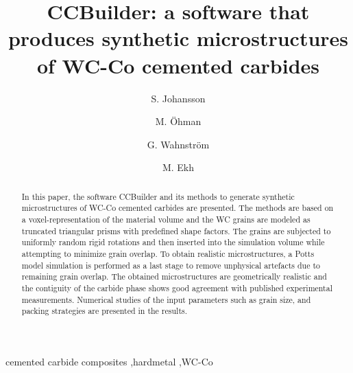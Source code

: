 \documentclass[3p,12pt]{elsarticle}
\begin{document}
\begin{frontmatter}

\title{CCBuilder: a software that produces synthetic microstructures of WC-Co cemented carbides}

\author[tf]{S. Johansson}

\author[tm]{M. Öhman}

\author[tf]{G. Wahnstr\"om}

\author[tm]{M. Ekh}

\address[tm]{Chalmers University of Technology, Department of Applied Mechanics, SE41258 G\"oteborg, Sweden}
\address[tf]{Chalmers University of Technology, Department of Applied Physics, SE41296 G\"oteborg, Sweden}

\begin{abstract}
In this paper, the software CCBuilder and its methods to generate synthetic microstructures of WC-Co cemented carbides are presented.
The methods are based on a voxel-representation of the material volume and the WC grains are modeled as truncated triangular prisms with predefined shape factors.
The grains are subjected to uniformly random rigid rotations and then inserted into the simulation volume while attempting to minimize grain overlap.
To obtain realistic microstructures, a Potts model simulation is performed as a last stage to remove unphysical artefacts due to remaining grain overlap.
The obtained microstructures are geometrically realistic and the contiguity of the carbide phase shows good agreement with published experimental measurements.
Numerical studies of the input parameters such as grain size, and packing strategies are presented in the results.
\end{abstract}

\begin{keyword}
cemented carbide composites \sep hardmetal \sep WC-Co
\end{keyword}

\end{frontmatter}
\end{document}
